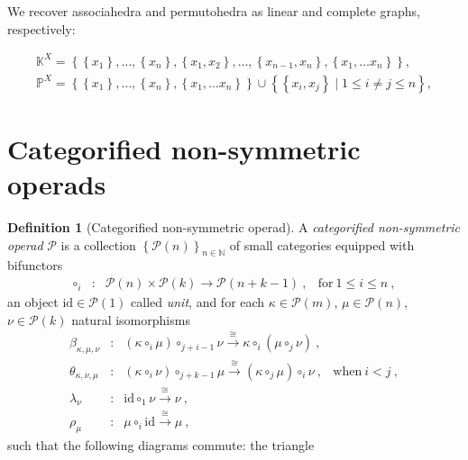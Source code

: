 \documentclass[10pt]{amsart}
\theoremstyle{definition}
\newtheorem{definition}[thm]{Definition}
\theoremstyle{remark}
\numberwithin{equation}{section}
\newcommand{\set}[1]{\left\{#1\right\}}
\newcommand{\0}{\color{blue}{\mathsf{0}}}
\newcommand{\setc}[2]{\set{#1 \mid #2}}
\newcommand{\hyper}[1]{{\mathbb #1}}
\begin{document}
We recover associahedra and permutohedra as  linear and complete graphs, respectively: 

$$\begin{array}{ll}
\hyper{K}^X= \set{\set{x_1},\ldots,\set{x_n},\set{x_1,x_2},\ldots,\set{x_{n-1},x_n},\set{x_1,\ldots x_n}}, \\
\hyper{P}^X= \set{\set{x_1},\ldots,\set{x_n},\set{x_1,\ldots x_n}} \cup \setc{\set{x_i,x_j}}{1\leq i\neq j\leq n},
\end{array}$$
\section{Categorified non-symmetric operads}


\begin{definition}[Categorified non-symmetric operad] A \emph{categorified non-symmetric operad} $\mathcal{P}$ is a collection $\left\{  \mathcal{P}(n)  \right\}_{n\in \mathbb{N}}$ of small categories equipped with bifunctors  
$$ \begin{array}{clll}
\circ_i&\colon& \mathcal{P}(n) \times
                  \mathcal{P}(k)
                  \longrightarrow \mathcal{P}(n+k-1) \ ,
                  & \text{for}\ 1 \leq i \leq n \ ,
\end{array}  $$
an object $\mathrm{id} \in \mathcal{P}(1)$ called \emph{unit}, and for each $\kappa \in \mathcal{P}(m)$,  $\mu \in \mathcal{P}(n)$, $\nu \in \mathcal{P}(k)$ natural isomorphisms 
$$ \begin{array}{clll}
    \beta_{\kappa,\mu,\nu}&\colon& 
    (\kappa \circ_i \mu) \circ_{j+i-1} \nu  \overset{\cong}{\longrightarrow} \kappa \circ_i (\mu \circ_j \nu) \ , &  \\
    \theta_{\kappa,\nu,\mu}&\colon& 
    (\kappa \circ_i \nu) \circ_{j+k-1} \mu 
    \overset{\cong}{\longrightarrow} (\kappa \circ_j \mu) \circ_i \nu \ , & \text{when}\ i < j \ , \\
    \lambda_\nu &\colon& 
    \mathrm{id} \circ_1 \nu \overset{\cong}{\longrightarrow} \nu \ , & \\
    \rho_\mu &\colon& 
    \mu \circ_i \mathrm{id} \overset{\cong}{\longrightarrow} \mu \ , & 
\end{array}  $$
such that the following diagrams commute: the triangle \\
\begin{center}
\end{center}
\end{definition}
\end{document}
